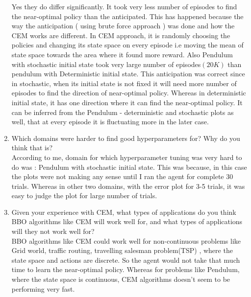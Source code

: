 \documentclass{article}
\begin{document}
\begin{enumerate}
Yes they do differ significantly. It took very less number of episodes to find the near-optimal policy than the anticipated. This has happened because the way the anticipation ( using brute force approach ) was done and how the CEM works are different. In CEM approach, it is randomly choosing the policies and changing its state space on every episode i.e moving the mean of state space towards the area where it found more reward.  Also Pendulum with stochastic initial state took very large number of episodes$(20K)$ than pendulum with Deterministic initial state. This anticipation was correct since in stochastic, when its initial state is not fixed it will need more number of episodes to find the direction of near-optimal policy. Whereas in deterministic initial state, it has one direction where it can find the near-optimal policy. It can be inferred from the Pendulum - deterministic and stochastic plots as well, that at every episode it is fluctuating more in the later case.

\item Which domains were harder to find good hyperparameters for? Why do you think that is?\\

According to me, domain for which hyperparameter tuning was very hard to do was : Pendulum with stochastic initial state. This was because, in this case the plots were not making any sense until I ran the agent for complete 30 trials.
Whereas in other two domains, with the error plot for 3-5 trials, it was easy to judge the plot for large number of trials.

\item Given your experience with CEM, what types of applications do you think BBO algorithms like CEM will work well for, and what types of applications will they not work well for?\\

BBO algorithms like CEM could work well for non-continuous problems like Grid world, traffic routing, travelling salesman problem(TSP) , where the state space and actions are discrete. So the agent would not take that much time to learn the near-optimal policy. Whereas for problems like Pendulum, where the state space is continuous, CEM algorithms doesn't seem to be performing very fast.

\end{enumerate}
\end{document}
